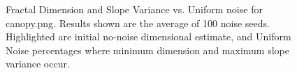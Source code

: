 \documentclass[12pt, oneside]{book}
\begin{document}
\begin{figure}[!b]
  \centering
  \caption[Fractal Dimension and Slope Variance vs. Uniform noise for canopy.png]{Fractal Dimension and Slope Variance vs. Uniform noise for canopy.png.  Results shown are the average of 100 noise seeds.  Highlighted are initial no-noise dimensional estimate, and Uniform Noise percentages where minimum dimension and maximum slope variance occur.}
  \label{fig:canopy_uniform_result}
\end{figure}
\end{document}
